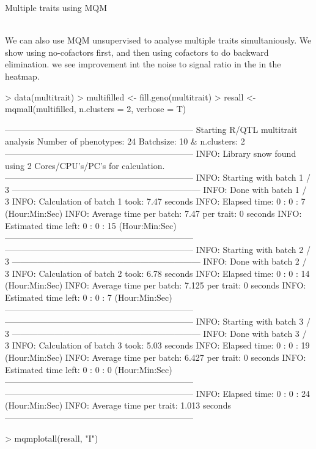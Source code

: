 \documentclass[a4paper]{article}
\begin{document}
\begin{Large} Multiple traits using MQM \end{Large}\\
We can also use MQM unsupervised to analyse multiple traits simultaniously. We show using no-cofactors first, and then using cofactors to do backward elimination. we see improvement int the noise to signal ratio in the in the heatmap.
\begin{Schunk}
\begin{Sinput}
> data(multitrait)
> multifilled <- fill.geno(multitrait)
> resall <- mqmall(multifilled, n.clusters = 2, verbose = T)
\end{Sinput}
\begin{Soutput}
------------------------------------------------------------------
Starting R/QTL multitrait analysis
Number of phenotypes: 24 
Batchsize: 10  & n.clusters: 2 
------------------------------------------------------------------
INFO: Library snow found using  2  Cores/CPU's/PC's for calculation.
------------------------------------------------------------------
INFO: Starting with batch 1 / 3 
------------------------------------------------------------------
INFO: Done with batch 1 / 3 
INFO: Calculation of batch 1 took: 7.47 seconds
INFO: Elapsed time: 0 : 0 : 7 (Hour:Min:Sec)
INFO: Average time per batch: 7.47  per trait: 0 seconds
INFO: Estimated time left: 0 : 0 : 15 (Hour:Min:Sec)
------------------------------------------------------------------
------------------------------------------------------------------
INFO: Starting with batch 2 / 3 
------------------------------------------------------------------
INFO: Done with batch 2 / 3 
INFO: Calculation of batch 2 took: 6.78 seconds
INFO: Elapsed time: 0 : 0 : 14 (Hour:Min:Sec)
INFO: Average time per batch: 7.125  per trait: 0 seconds
INFO: Estimated time left: 0 : 0 : 7 (Hour:Min:Sec)
------------------------------------------------------------------
------------------------------------------------------------------
INFO: Starting with batch 3 / 3 
------------------------------------------------------------------
INFO: Done with batch 3 / 3 
INFO: Calculation of batch 3 took: 5.03 seconds
INFO: Elapsed time: 0 : 0 : 19 (Hour:Min:Sec)
INFO: Average time per batch: 6.427  per trait: 0 seconds
INFO: Estimated time left: 0 : 0 : 0 (Hour:Min:Sec)
------------------------------------------------------------------
------------------------------------------------------------------
INFO: Elapsed time: 0 : 0 : 24 (Hour:Min:Sec)
INFO: Average time per trait: 1.013 seconds
------------------------------------------------------------------
\end{Soutput}
\begin{Sinput}
> mqmplotall(resall, "I")
\end{Sinput}
\end{Schunk}
\end{document}
